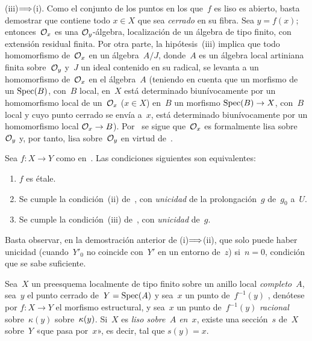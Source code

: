 (iii)$\To$(i). Como el conjunto de los puntos en los que~$f$ es liso es abierto, basta demostrar que contiene todo $x\in X$ que sea \emph{cerrado} en su fibra. Sea $y=f(x)$; entonces~$\cal{O}_x$ es una $\cal{O}_y$-álgebra, localización de un álgebra de tipo finito, con extensión residual finita. Por otra parte, la hipótesis~(iii) implica que todo homomorfismo de~$\cal{O}_x$ en un álgebra~$A/J$, donde~$A$ es un álgebra local artiniana finita sobre~$\cal{O}_y$ y~$J$ un ideal contenido en su radical, se levanta a un homomorfismo de~$\cal{O}_x$ en el álgebra~$A$ (teniendo en cuenta que
{un morfismo de un $\Spec(B)$, con~$B$ local, en~$X$ está determinado biunívocamente por un homomorfismo local de un~$\cal{O}_x$ ($x\in X$) en~$B$}
{un morfismo $\Spec(B)\to X$, con~$B$ local y cuyo punto cerrado se envía a~$x$, está determinado biunívocamente por un homomorfismo local $\cal{O}_x\to B$}).
Por~ se sigue que~$\cal{O}_x$ es formalmente lisa sobre~$\cal{O}_y$ y, por tanto, lisa sobre~$\cal{O}_y$ en virtud de~.

\begin{corollaire}
\label{III.3.2}
Sea $f\colon X\to Y$ como en~. Las condiciones siguientes son equivalentes:
\begin{enumerate}
\item[(i)] $f$ es étale.
\item[(ii)] Se cumple la condición~\textup{(ii)} de~, con \emph{unicidad} de la prolongación~$g$ de~$g_0$ a~$U$.
\item[(iii)] Se cumple la condición~\textup{(iii)} de~, con \emph{unicidad} de~$g$.
\end{enumerate}
\end{corollaire}

Basta observar, en la demostración anterior de (i)$\To$(ii), que solo puede haber unicidad (cuando~$Y'_0$ no coincide con~$Y'$ en un entorno de~$z$) si~$n=0$, condición que se sabe suficiente.

\begin{corollaire}
\label{III.3.3}
Sea~$X$ un preesquema localmente de tipo finito sobre un anillo local \emph{completo}~$A$, sea~$y$ el punto cerrado de~$Y=\Spec(A)$
{y sea~$x$ un punto de~$f^{-1}(y)$}
{, denótese por $f\colon X\to Y$ el morfismo estructural, y sea~$x$ un punto de~$f^{-1}(y)$}
\emph{racional}
{sobre~$\kappa(y)$}
{sobre~$\kres(y)$}.
Si~$X$ es \emph{liso sobre~$A$ en~$x$}, existe una sección~$s$ de~$X$ sobre~$Y$ «que pasa por~$x$», es decir, tal que $s(y)=x$.
\end{corollaire}

